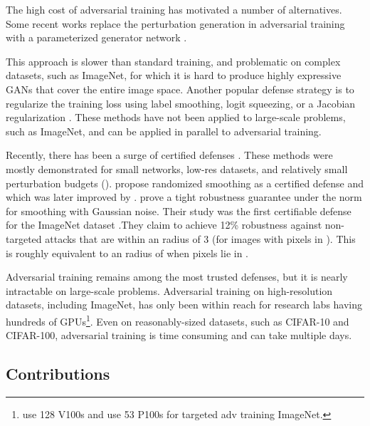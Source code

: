 \documentclass{article}
\begin{document}
The high cost of adversarial training has motivated a number of alternatives.
Some recent works replace the perturbation generation in adversarial training with a parameterized generator network \citep{baluja2017adversarial,poursaeed2017generative,xiao2018generating}.

This approach is slower than standard training, and problematic on complex datasets, such as ImageNet, for which it is hard to produce highly expressive GANs that cover the entire image space.
Another popular defense strategy is to regularize the training loss using label smoothing, logit squeezing, or a Jacobian regularization \citep{shafahi2019label,mosbach2018logit,ross2018improving,hein2017formal,jakubovitz2018improving,yu2018interpreting}. These methods have not been applied to large-scale problems, such as ImageNet, and can be applied in parallel to adversarial training. 

Recently, there has been a surge of certified defenses \citep{wong2017provable, wong2018scaling, raghunathan2018semidefinite, raghunathan2018certified, wang2018mixtrain}. These methods were mostly demonstrated for small networks, low-res datasets, and relatively small perturbation budgets (). 
\citet{lecuyer2018certified} propose randomized smoothing as a certified defense and which was later improved by \citet{DBLP:journals/corr/abs-1809-03113}.  \citet{cohen2019certified} prove a tight robustness guarantee under the  norm for smoothing with Gaussian noise.  
Their study was the first certifiable defense for the ImageNet dataset \citep{imagenet_cvpr09}.They claim to achieve 12\% robustness against non-targeted attacks that are within an  radius of 3 (for images with pixels in ). This is roughly equivalent to an  radius of  when pixels lie in . 

Adversarial training remains among the most trusted defenses, but it is nearly intractable on large-scale problems. Adversarial training on high-resolution datasets, including ImageNet, has only been within reach for research labs having hundreds of GPUs\footnote{\cite{xie2018feature} use 128 V100s and \cite{kannan2018adversarial} use 53 P100s for targeted adv training ImageNet.}. Even on reasonably-sized datasets, such as CIFAR-10 and CIFAR-100, adversarial training is time consuming and can take multiple days.


\subsection*{Contributions}
\end{document}
